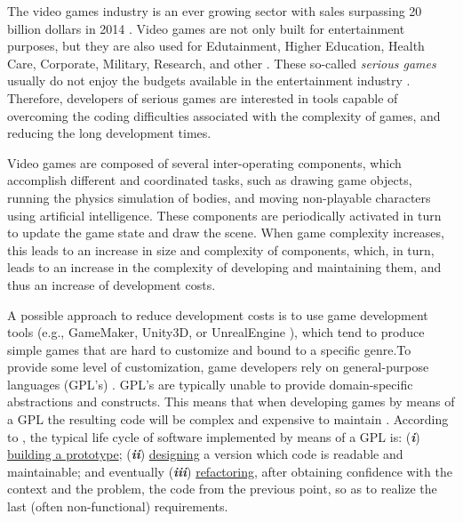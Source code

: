 The video games industry is an ever growing sector with sales surpassing 20 billion dollars in 2014 \cite{game_sales_esa}. Video games are not only built for entertainment purposes, but they are also used for Edutainment, Higher Education, Health Care, Corporate, Military, Research, and other \cite{CMP_Media_2004,serious_games}. These so-called \textit{serious games} usually do not enjoy the budgets available in the entertainment industry \cite{stapleton2004serious}. Therefore, developers of serious games are interested in tools capable of overcoming the coding difficulties associated with the complexity of games, and reducing the long development times.

Video games are composed of several inter-operating components, which accomplish different and coordinated tasks, such as drawing game objects, running the physics simulation of bodies, and moving non-playable characters using artificial intelligence. These components are periodically activated in turn to update the game state and draw the scene. When game complexity increases, this leads to an increase in size and complexity of components, which, in turn, leads to an increase in the complexity of developing and maintaining them, and thus an increase of development costs.


A possible approach to reduce development costs is to use game development tools (e.g., GameMaker, Unity3D, or UnrealEngine \cite{petridis2010engine}), which tend to produce simple games that are hard to customize and bound to a specific genre.To provide some level of customization, game developers rely on general-purpose languages (GPL's) \cite{lewis2002game}. GPL's are typically unable to provide domain-specific abstractions and constructs. This means that when developing games by means of a GPL the resulting code will be complex and expensive to maintain \cite{Rocki:2014:FAP:2554850.2555029,sujeeth2014delite}. According to \cite{beck2000extreme}, the typical life cycle of software implemented by means of a GPL is: (\textit{\textbf{i}}) \underline{building a prototype}; (\textit{\textbf{ii}}) \underline{designing} a version which code is readable and maintainable; and eventually (\textit{\textbf{iii}}) \underline{refactoring}, after obtaining confidence with the context and the problem, the code from the previous point, so as to realize the last (often non-functional) requirements. 

